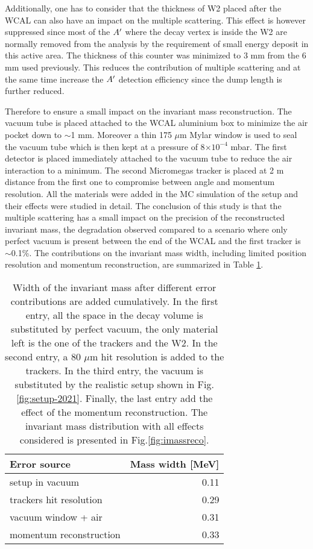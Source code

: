 Additionally, one has to consider that the thickness of W2 placed after the WCAL can also have an impact on the multiple scattering. This effect is however suppressed since most of the $A'$ where the decay vertex is inside the W2 are normally removed from the analysis by the requirement of small energy deposit in this active area. The thickness of this counter was minimized to 3 mm from the 6 mm used previously. This reduces the contribution of multiple scattering and at the same time increase the $A'$ detection efficiency since the dump length is further reduced.

Therefore to ensure a small impact on the invariant mass reconstruction. The vacuum tube is placed attached to the WCAL aluminium box to minimize the air pocket down to $\sim$1 mm. Moreover a thin 175 $\mu$m Mylar window is used to seal the vacuum tube which is then kept at a pressure of 8$\times 10^{-4}$ mbar. The first detector is placed immediately attached to the vacuum tube to reduce the air interaction to a minimum. The second Micromegas tracker is placed at 2 m distance from the first one to compromise between angle and momentum resolution. All the materials were added in the MC simulation of the setup and their effects were studied in detail. The conclusion of this study is that the multiple scattering has a small impact on the precision of the reconstructed invariant mass, the degradation observed compared to a scenario where only perfect vacuum is present between the end of the WCAL and the first tracker is $\sim$0.1\%. The contributions on the invariant mass width, including limited position resolution and momentum reconstruction, are summarized in Table \ref{tab:imass-width}.

\begin{center}
  \begin{table}[bth!]
    \centering
    \begin{tabular}{|l|r|}
      \hline
      Error source & Mass width [MeV]\\
      \hline
      setup in vacuum & 0.11\\
      trackers hit resolution & 0.29\\
      vacuum window + air & 0.31\\
      momentum reconstruction & 0.33\\
      \hline
    \end{tabular}
    \label{tab:imass-width}    
    \caption[Error budget for the invariant mass in 2021 setup]{Width of the invariant mass after different error contributions are added cumulatively. In the first entry, all the space in the decay volume is substituted by perfect vacuum, the only material left is the one of the trackers and the W2. In the second entry, a 80 $\mu$m hit resolution is added to the trackers. In the third entry, the vacuum is substituted by the realistic setup shown in Fig.\ref{fig:setup-2021}. Finally, the last entry add the effect of the momentum reconstruction. The invariant mass distribution with all effects considered is presented in Fig.\ref{fig:imassreco}.}
  \end{table}
\end{center}

